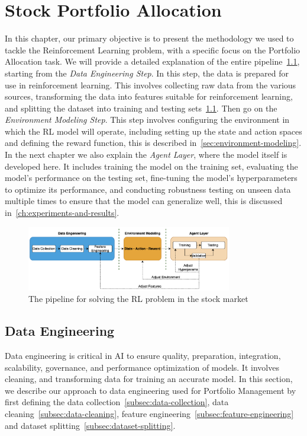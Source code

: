 \documentclass[../xlapes02]{subfiles}
\begin{document}
    \chapter{Stock Portfolio Allocation}\label{ch:stock-portfolio-allocation}
    In this chapter, our primary objective is to present the methodology we used to tackle the Reinforcement Learning problem, with a specific focus on the Portfolio Allocation task. We will provide a detailed explanation of the entire pipeline~\cref{fig:pipeline}, starting from the \emph{Data Engineering Step}. In this step, the data is prepared for use in reinforcement learning. This involves collecting raw data from the various sources, transforming the data into features suitable for reinforcement learning, and splitting the dataset into training and testing sets~\cref{sec:data-engineering}. Then go on the \emph{Environment Modeling Step}. This step involves configuring the environment in which the RL model will operate, including setting up the state and action spaces and defining the reward function, this is described in~\cref{sec:environment-modeling}. In the next chapter we also explain the \emph{Agent Layer}, where the model itself is developed here. It includes training the model on the training set, evaluating the model's performance on the testing set, fine-tuning the model's hyperparameters to optimize its performance, and conducting robustness testing on unseen data multiple times to ensure that the model can generalize well, this is discussed in~\cref{ch:experiments-and-results}.

    \begin{figure}[ht!]
        \centering
        \includegraphics[width=0.8\textwidth]{./image/pipeline}
        \caption{The pipeline for solving the RL problem in the stock market~\cite{liu2022finrlmeta}}
        \label{fig:pipeline}
    \end{figure}

    \section{Data Engineering}\label{sec:data-engineering}
    Data engineering is critical in AI to ensure quality, preparation, integration, scalability, governance, and performance optimization of models. It involves cleaning, and transforming data for training an accurate model. In this section, we describe our approach to data engineering used for Portfolio Management by first defining the data collection~\cref{subsec:data-collection}, data cleaning~\cref{subsec:data-cleaning}, feature engineering~\cref{subsec:feature-engineering} and dataset splitting~\cref{subsec:dataset-splitting}.
\end{document}
